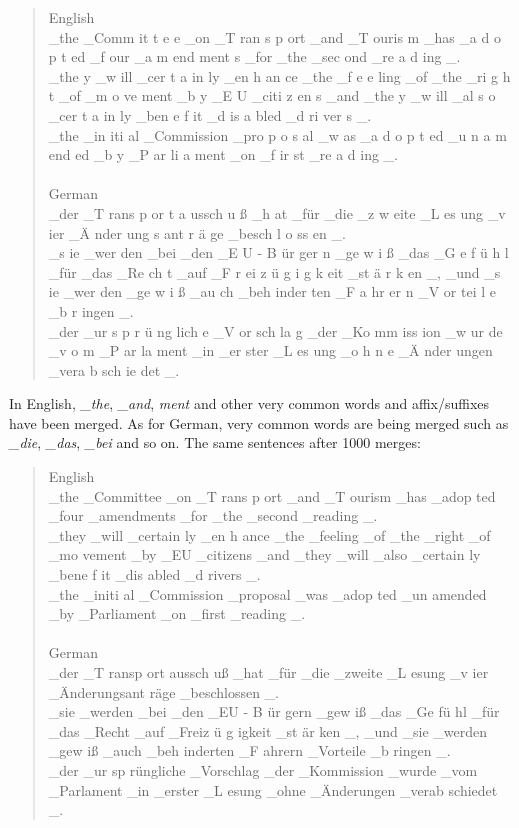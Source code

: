 \begin{quote}
	English\\
	\_the \_Comm it t e e \_on \_T ran s p ort \_and \_T ouris m \_has \_a d o p t ed \_f our \_a m end ment s \_for \_the \_sec ond \_re a d ing \_.\\
	\_the y \_w ill \_cer t a in ly \_en h an ce \_the \_f e e ling \_of \_the \_ri g h t \_of \_m o ve ment \_b y \_E U \_citi z en s \_and \_the y \_w ill \_al s o \_cer t a in ly \_ben e f it \_d is a bled \_d ri ver s \_.\\
	\_the \_in iti al \_Commission \_pro p o s al \_w as \_a d o p t ed \_u n a m end ed \_b y \_P ar li a ment \_on \_f ir st \_re a d ing \_.\\\\
	German\\
	\_der \_T rans p or t a ussch u ß \_h at \_für \_die \_z w eite \_L es ung \_v ier \_Ä nder ung s ant r ä ge \_besch l o ss en \_.\\
	\_s ie \_wer den \_bei \_den \_E U - B ür ger n \_ge w i ß \_das \_G e f ü h l \_für \_das \_Re ch t \_auf \_F r ei z ü g i g k eit \_st ä r k en \_, \_und \_s ie \_wer den \_ge w i ß \_au ch \_beh inder ten \_F a hr er n \_V or tei l e \_b r ingen \_.\\
	\_der \_ur s p r ü ng lich e \_V or sch la g \_der \_Ko mm iss ion \_w ur de \_v o m \_P ar la ment \_in \_er ster \_L es ung \_o h n e \_Ä nder ungen \_vera b sch ie det \_.
\end{quote}

In English, \emph{\_the}, \emph{\_and}, \emph{ment} and other very common words and affix/suffixes have been merged. As for German, very common words are being merged such as \emph{\_die}, \emph{\_das}, \emph{\_bei} and so on. The same sentences after 1000 merges:

\begin{quote}
	English\\
	\_the \_Committee \_on \_T rans p ort \_and \_T ourism \_has \_adop ted \_four \_amendments \_for \_the \_second \_reading \_.\\
	\_they \_will \_certain ly \_en h ance \_the \_feeling \_of \_the \_right \_of \_mo vement \_by \_EU \_citizens \_and \_they \_will \_also \_certain ly \_bene f it \_dis abled \_d rivers \_.\\
	\_the \_initi al \_Commission \_proposal \_was \_adop ted \_un amended \_by \_Parliament \_on \_first \_reading \_.\\\\
	German\\
	\_der \_T ransp ort aussch uß \_hat \_für \_die \_zweite \_L esung \_v ier \_Änderungsant räge \_beschlossen \_.\\
	\_sie \_werden \_bei \_den \_EU - B ür gern \_gew iß \_das \_Ge fü hl \_für \_das \_Recht \_auf \_Freiz ü g igkeit \_st är ken \_, \_und \_sie \_werden \_gew iß \_auch \_beh inderten \_F ahrern \_Vorteile \_b ringen \_.\\
	\_der \_ur sp rüngliche \_Vorschlag \_der \_Kommission \_wurde \_vom \_Parlament \_in \_erster \_L esung \_ohne \_Änderungen \_verab schiedet \_.
\end{quote}

